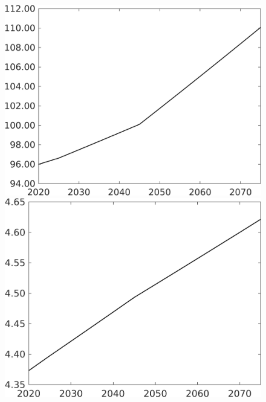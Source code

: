 \begin{figure}[h!!]
\begin{minipage}[]{0.32\textwidth}
	\end{minipage}
	\begin{minipage}[]{0.32\textwidth}
		\includegraphics[width=1\textwidth]{../../codding_model/own_basedOnFried/optimalPol_elastS_DisuSci/figures/all_1705/Single_OPT_T_NoTaus_Ag_spillover0_sep1_BN0_ineq0_etaa0.79.png}
	\end{minipage}
\begin{minipage}[]{0.32\textwidth}
	\includegraphics[width=1\textwidth]{../../codding_model/own_basedOnFried/optimalPol_elastS_DisuSci/figures/all_1705/Single_OPT_T_NoTaus_An_spillover0_sep1_BN0_ineq0_etaa0.79.png}

\end{minipage}
\end{figure}
